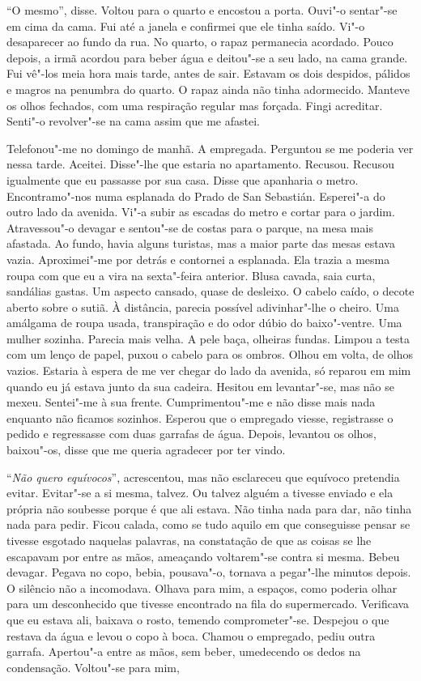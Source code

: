 ``O mesmo'',
disse. Voltou para o quarto e encostou a porta. Ouvi"-o sentar"-se em
cima da cama. Fui até a janela e confirmei que ele tinha saído. Vi"-o
desaparecer ao fundo da rua. No quarto, o rapaz permanecia acordado.
Pouco depois, a irmã acordou para beber água e deitou"-se a seu lado, na
cama grande. Fui vê"-los meia hora mais tarde, antes de sair. Estavam os
dois despidos, pálidos e magros na penumbra do quarto. O rapaz ainda não
tinha adormecido. Manteve os olhos fechados, com uma respiração regular
mas forçada. Fingi acreditar. Senti"-o revolver"-se na cama assim que me
afastei.

Telefonou"-me no domingo de manhã. A empregada. Perguntou se me poderia
ver nessa tarde. Aceitei. Disse"-lhe que estaria no apartamento.
Recusou. Recusou igualmente que eu passasse por sua casa. Disse que
apanharia o metro. Encontramo"-nos numa esplanada do Prado de San
Sebastián. Esperei"-a do outro lado da avenida. Vi"-a subir as escadas
do metro e cortar para o jardim. Atravessou"-o devagar e sentou"-se de
costas para o parque, na mesa mais afastada. Ao fundo, havia alguns
turistas, mas a maior parte das mesas estava vazia. Aproximei"-me por
detrás e contornei a esplanada. Ela trazia a mesma roupa com que eu a
vira na sexta"-feira anterior. Blusa cavada, saia curta, sandálias
gastas. Um aspecto cansado, quase de desleixo. O cabelo caído, o decote
aberto sobre o sutiã. À distância, parecia possível adivinhar"-lhe o
cheiro. Uma amálgama de roupa usada, transpiração e do odor dúbio do
baixo"-ventre. Uma mulher sozinha. Parecia mais velha. A pele baça,
olheiras fundas. Limpou a testa com um lenço de papel, puxou o cabelo
para os ombros. Olhou em volta, de olhos vazios. Estaria à espera de me
ver chegar do lado da avenida, só reparou em mim quando eu já estava
junto da sua cadeira. Hesitou em levantar"-se, mas não se mexeu.
Sentei"-me à sua frente. Cumprimentou"-me e não disse mais nada enquanto
não ficamos sozinhos. Esperou que o empregado viesse, registrasse o
pedido e regressasse com duas garrafas de água. Depois, levantou os
olhos, baixou"-os, disse que me queria agradecer por ter vindo.

``\emph{Não quero equívocos}'',
acrescentou, mas não esclareceu que equívoco pretendia evitar.
Evitar"-se a si mesma, talvez. Ou talvez alguém a tivesse enviado e ela
própria não soubesse porque é que ali estava. Não tinha nada para dar,
não tinha nada para pedir. Ficou calada, como se tudo aquilo em que
conseguisse pensar se tivesse esgotado naquelas palavras, na constatação
de que as coisas se lhe escapavam por entre as mãos, ameaçando
voltarem"-se contra si mesma. Bebeu devagar. Pegava no copo, bebia,
pousava"-o, tornava a pegar"-lhe minutos depois. O silêncio não a
incomodava. Olhava para mim, a espaços, como poderia olhar para um
desconhecido que tivesse encontrado na fila do supermercado. Verificava
que eu estava ali, baixava o rosto, temendo comprometer"-se. Despejou o
que restava da água e levou o copo à boca. Chamou o empregado, pediu
outra garrafa. Apertou"-a entre as mãos, sem beber, umedecendo os dedos
na condensação. Voltou"-se para mim,

